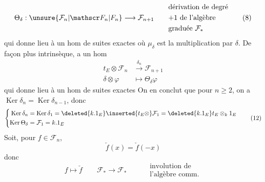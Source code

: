 \[
\Theta_\delta:\unsure{\mathcal F_n|\mathscr F_n|F_n}\longrightarrow\mathcal F_{n+1}
\qquad\begin{aligned}&\text{dérivation de degré}\\&\text{$+1$ de l'algèbre}\\&\text{graduée $\mathcal F_*$}\end{aligned}
\tag*{(8)}
\]
qui donne lieu à un hom de suites exactes
où $\mu_\delta$ est la multiplication par $\delta$. De façon plus intrinsèque,  a un hom
\[
\begin{aligned}
t_E\otimes\mathcal F_n&\xrightarrow{\delta_n}\mathcal F_{n+1}\\
\delta\otimes\varphi&\longmapsto\Theta_\delta\varphi
\end{aligned}\tag*{(10)}
\]
qui donne lieu à un hom de suites exactes
On en conclut que pour $n\geq2$, on a $\operatorname{Ker}\delta_n=\operatorname{Ker}\delta_{n-1}$, donc
\[
\left\{\begin{aligned}
\operatorname{Ker}\delta_n&=\operatorname{Ker}\delta_1=\deleted{k.1_E}\inserted{t_E\otimes}\mathcal F_1=\deleted{k.1_E}t_E\otimes_k1_E\\
\operatorname{Ker}\Theta_\delta&=\mathcal F_1=k.1_E
\end{aligned}\right.\tag*{(12)}
\]
Soit, pour $f\in\mathcal F_n$,
\[
\check f(x)=\check f(-x)\tag*{(13)}
\]
donc
\[
f\longmapsto\check f\qquad \mathcal F_*\longrightarrow\mathcal F_*
\qquad\begin{aligned}&\text{involution de}\\&\text{l'algèbre comm.}\end{aligned}\tag*{(14)}
\]
